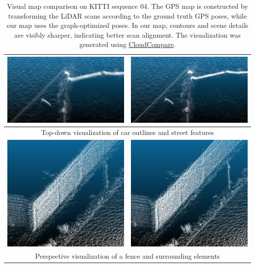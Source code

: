\begin{table}[h]
{\begin{tabular}{cc}
            \includegraphics[width=0.44\linewidth]{images/map_compare/kitti/curb/capture_gps.png}  &
            \includegraphics[width=0.44\linewidth]{images/map_compare/kitti/curb/capture_ours.png}                    \\
            \hline
            \multicolumn{2}{c}{Top-down visualization of car outlines and street features}                            \\
            \hline
            \includegraphics[width=0.34\linewidth]{images/map_compare/kitti/fence/capture_gps.png} &
            \includegraphics[width=0.34\linewidth]{images/map_compare/kitti/fence/capture_ours.png}                   \\
            \hline
            \multicolumn{2}{c}{Perspective visualization of a fence and surrounding elements}                         \\
            \hline
        \end{tabular}
    }

    \caption{Visual map comparison on KITTI sequence 04. The GPS map is constructed by transforming the LiDAR scans according to the ground truth GPS poses, while our map uses the graph-optimized poses. In our map, contours and scene details are visibly sharper, indicating better scan alignment. The visualization was generated using \href{https://www.danielgm.net/cc/}{CloudCompare}.}
    \label{tab:map-eval-viz}
\end{table}


